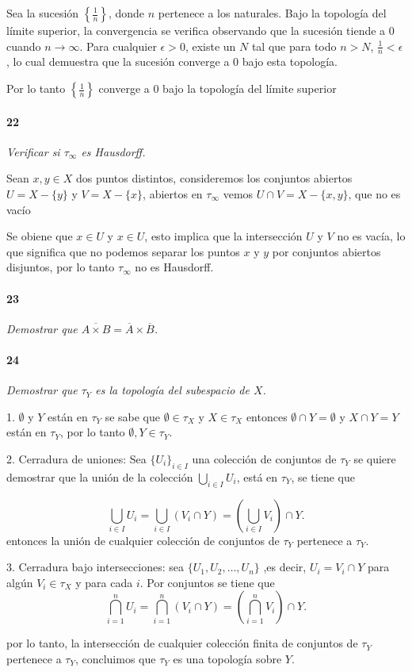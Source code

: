 \documentclass[12pt]{article}
\begin{document}
Sea la sucesi\'on \(\left\{\frac{1}{n}\right\}\), donde \(n\) pertenece a los naturales. Bajo la topolog\'ia del l\'imite superior, la convergencia se verifica observando que la sucesi\'on tiende a 0 cuando \(n \to \infty\). Para cualquier \(\epsilon > 0\), existe un \(N\) tal que para todo \(n > N\), \(\frac{1}{n} < \epsilon\), lo cual demuestra que la sucesión converge a 0 bajo esta topolog\'ia. 

Por lo tanto \(\left\{\frac{1}{n}\right\}\) converge a 0 bajo la topolog\'ia del l\'imite superior

\paragraph{22}
\textit{Verificar si \(\tau_{\infty}\) es Hausdorff.}

Sean \(x, y \in X\) dos puntos distintos, consideremos los conjuntos abiertos \(U = X - \{y\}\) y \(V = X - \{x\}\), abiertos en \(\tau_{\infty}\)
vemos \(U \cap V = X - \{x, y\}\), que no es vac\'io

Se obiene que \(x \in U\) y \(x \in U\), esto implica que la intersecci\'on \(U\) y \(V\) no es vacía, lo que significa que no podemos separar los puntos
\(x\) y \(y\) por conjuntos abiertos disjuntos, por lo tanto \(\tau_{\infty}\) no es Hausdorff.

\paragraph{23}
\textit{Demostrar que \(\overline{A \times B} = \overline{A} \times \overline{B}\).}

\paragraph{24}
\textit{Demostrar que \(\tau_Y\) es la topología del subespacio de \( X \).}

1. \( \emptyset \) y \( Y \) est\'an en \( \tau_Y \) se sabe que \( \emptyset \in \tau_X \) y \( X \in \tau_X \)
entonces \( \emptyset \cap Y = \emptyset \) y \( X \cap Y = Y \) están en \( \tau_Y \), por lo tanto \( \emptyset, Y \in \tau_Y \).

2. Cerradura de uniones: Sea \( \{ U_i \}_{i \in I} \) una colecci\'on de conjuntos de \( \tau_Y \)
se quiere demostrar que la unión de la colecci\'on \( \bigcup_{i \in I} U_i \), está en \( \tau_Y \), se tiene que

\[
\bigcup_{i \in I} U_i = \bigcup_{i \in I} (V_i \cap Y) = \left( \bigcup_{i \in I} V_i \right) \cap Y.
\]
entonces la unión de cualquier colecci\'on de conjuntos de \( \tau_Y \) pertenece a \( \tau_Y \).

3. Cerradura bajo intersecciones: sea \( \{ U_1, U_2, \dots, U_n \} \) ,es decir, \( U_i = V_i \cap Y \) para algún \( V_i \in \tau_X \) y para cada \( i \). 
Por conjuntos se tiene que
\[
\bigcap_{i=1}^n U_i = \bigcap_{i=1}^n (V_i \cap Y) = \left( \bigcap_{i=1}^n V_i \right) \cap Y.
\]

por lo tanto, la intersección de cualquier colecci\'on finita de conjuntos de \( \tau_Y \) pertenece a \( \tau_Y \), 
concluimos que \( \tau_Y \) es una topolog\'ia sobre \( Y \).
\end{document}
